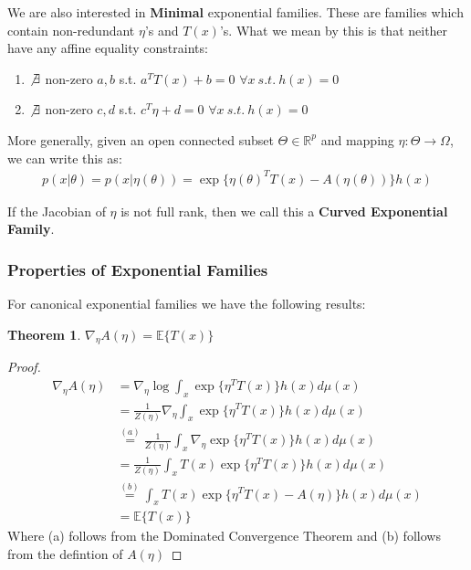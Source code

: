 \documentclass[]{article}
\theoremstyle{mattstyle}
\newtheorem{theorem}{Theorem}[section]
\theoremstyle{definition}
\begin{document}
We are also interested in \textbf{Minimal} exponential families. These are families which contain non-redundant $\eta$'s and $T(x)$'s. What we mean by this is that neither have any affine equality constraints:
\begin{enumerate}
	\item $\not\exists$ non-zero $a,b$ s.t. $a^TT(x)+b=0$ $\forall x \ s.t.\ h(x)=0$
	\item $\not\exists$ non-zero $c,d$ s.t. $c^T\eta+d=0$ $\forall x \ s.t.\ h(x)=0$
\end{enumerate}

More generally, given an open connected subset $\Theta \in \mathbb{R}^p$ and mapping $\eta: \Theta \rightarrow \Omega$, we can write this as:
\begin{align}
p(x|\theta) = p(x|\eta(\theta)) = \exp\{ \eta(\theta)^TT(x) - A(\eta(\theta))\}h(x)
\end{align}

If the Jacobian of $\eta$ is not full rank, then 
we call this a \textbf{Curved Exponential Family}.

\subsubsection{Properties of Exponential Families}

For canonical exponential families we have the following results:

\begin{theorem}
	$\nabla_{\eta}A(\eta) = \mathbb{E}\{T(x)\}$
\end{theorem}
\begin{proof}
	\begin{align*}
	\nabla_{\eta}A(\eta) &= \nabla_{\eta} \log \int_x \exp\{ \eta^TT(x)\}h(x)d\mu(x)\\
	 &= \frac{1}{Z(\eta)}\nabla_{\eta} \int_x \exp\{ \eta^TT(x)\}h(x)d\mu(x)\\
	 &\overset{(a)}{=} \frac{1}{Z(\eta)}\int_x \nabla_{\eta} \exp\{ \eta^TT(x)\}h(x)d\mu(x)\\
	 &= \frac{1}{Z(\eta)}\int_x T(x)\exp\{ \eta^TT(x)\}h(x)d\mu(x)\\
	 &\overset{(b)}{=}\int_x T(x)\exp\{ \eta^TT(x)-A(\eta)\}h(x)d\mu(x)\\
	 &=\mathbb{E}\{T(x)\}
	\end{align*}
	Where (a) follows from the Dominated Convergence Theorem and (b) follows from the defintion of $A(\eta)$
\end{proof}
\end{document}
